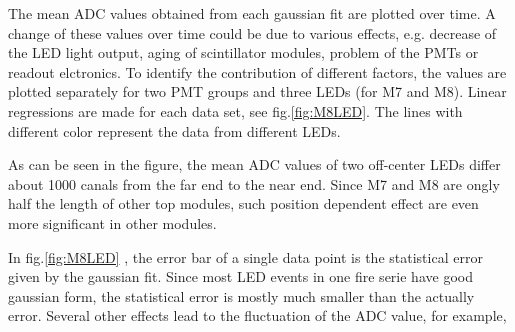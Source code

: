 The mean ADC values obtained from each gaussian fit are plotted over time. A change of these values over time could be due to various effects, e.g. decrease of the LED light output, aging of scintillator modules, problem of the PMTs or readout elctronics. To identify the contribution of different factors, the values are plotted separately for two PMT groups and three LEDs (for M7 and M8). Linear regressions are made for each data set, see fig.\ref{fig:M8LED}. The lines with different color represent the data from different LEDs.

As can be seen in the figure, the mean ADC values of two off-center LEDs differ about 1000 canals from the far end to the near end. Since M7 and M8 are ongly half the length of other top modules, such position dependent effect are even more significant in other modules.

In fig.\ref{fig:M8LED} , the error bar of a single data point is the statistical error given by the gaussian fit. Since most LED events in one fire serie have good gaussian form, the statistical error is mostly much smaller than the actually error. Several other effects lead to the fluctuation of the ADC value, for example,

\begin{table}
  \caption{}
  \label{}
  \begin{tabular}{c c c c c}

  \end{tabular}

\end{table}





